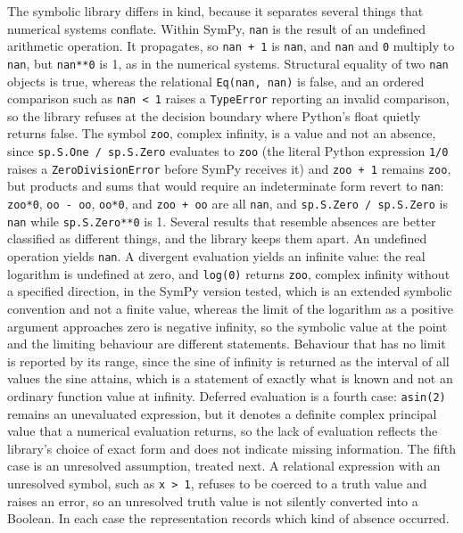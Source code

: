 \documentclass[11pt]{article}
\theoremstyle{remark}
\begin{document}
The symbolic library differs in kind, because it separates several things that numerical systems conflate. Within SymPy, \verb|nan| is the result of an undefined arithmetic operation. It propagates, so \verb|nan + 1| is \verb|nan|, and \verb|nan| and \verb|0| multiply to \verb|nan|, but \verb|nan**0| is 1, as in the numerical systems. Structural equality of two \verb|nan| objects is true, whereas the relational \verb|Eq(nan, nan)| is false, and an ordered comparison such as \verb|nan < 1| raises a \verb|TypeError| reporting an invalid comparison, so the library refuses at the decision boundary where Python's float quietly returns false. The symbol \verb|zoo|, complex infinity, is a value and not an absence, since \verb|sp.S.One / sp.S.Zero| evaluates to \verb|zoo| (the literal Python expression \verb|1/0| raises a \verb|ZeroDivisionError| before SymPy receives it) and \verb|zoo + 1| remains \verb|zoo|, but products and sums that would require an indeterminate form revert to \verb|nan|: \verb|zoo*0|, \verb|oo - oo|, \verb|oo*0|, and \verb|zoo + oo| are all \verb|nan|, and \verb|sp.S.Zero / sp.S.Zero| is \verb|nan| while \verb|sp.S.Zero**0| is 1. Several results that resemble absences are better classified as different things, and the library keeps them apart. An undefined operation yields \verb|nan|. A divergent evaluation yields an infinite value: the real logarithm is undefined at zero, and \verb|log(0)| returns \verb|zoo|, complex infinity without a specified direction, in the SymPy version tested, which is an extended symbolic convention and not a finite value, whereas the limit of the logarithm as a positive argument approaches zero is negative infinity, so the symbolic value at the point and the limiting behaviour are different statements. Behaviour that has no limit is reported by its range, since the sine of infinity is returned as the interval of all values the sine attains, which is a statement of exactly what is known and not an ordinary function value at infinity. Deferred evaluation is a fourth case: \verb|asin(2)| remains an unevaluated expression, but it denotes a definite complex principal value that a numerical evaluation returns, so the lack of evaluation reflects the library's choice of exact form and does not indicate missing information. The fifth case is an unresolved assumption, treated next. A relational expression with an unresolved symbol, such as \verb|x > 1|, refuses to be coerced to a truth value and raises an error, so an unresolved truth value is not silently converted into a Boolean. In each case the representation records which kind of absence occurred.
\end{document}
